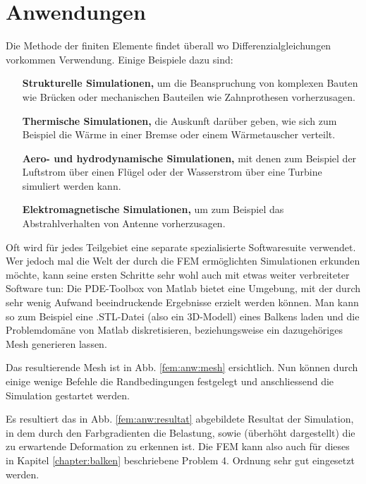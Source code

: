%
%
%
%
\section{Anwendungen\label{fem:section:anwendungen}}

Die Methode der finiten Elemente findet überall wo Differenzialgleichungen vorkommen Verwendung.
Einige Beispiele dazu sind:
\begin{itemize}
    \item [\textbf{Strukturelle Simulationen,}] um die Beanspruchung von komplexen Bauten wie Brücken oder mechanischen Bauteilen wie Zahnprothesen vorherzusagen.
    \item [\textbf{Thermische Simulationen,}] die Auskunft darüber geben, wie sich zum Beispiel die Wärme in einer Bremse oder einem Wärmetauscher verteilt.
    \item [\textbf{Aero- und hydrodynamische Simulationen,}] mit denen zum Beispiel der Luftstrom über einen Flügel oder der Wasserstrom über eine Turbine simuliert werden kann.
    \item [\textbf{Elektromagnetische Simulationen,}] um zum Beispiel das Abstrahlverhalten von Antenne vorherzusagen.
\end{itemize}

Oft wird für jedes Teilgebiet eine separate spezialisierte Softwaresuite verwendet.
Wer jedoch mal die Welt der durch die FEM ermöglichten Simulationen erkunden möchte, kann seine ersten Schritte sehr wohl auch mit etwas weiter verbreiteter Software tun: 
Die PDE-Toolbox von Matlab bietet eine Umgebung, mit der durch sehr wenig Aufwand beeindruckende Ergebnisse erzielt werden können.
Man kann so zum Beispiel eine .STL-Datei (also ein 3D-Modell) eines Balkens laden und die Problemdomäne von Matlab diskretisieren, beziehungsweise ein dazugehöriges Mesh generieren lassen. 

Das resultierende Mesh ist in Abb. \ref{fem:anw:mesh} ersichtlich.
Nun können durch einige wenige Befehle die Randbedingungen festgelegt und anschliessend die Simulation gestartet werden.

Es resultiert das in Abb. \ref{fem:anw:resultat} abgebildete Resultat der Simulation, in dem durch den Farbgradienten die Belastung, sowie (überhöht dargestellt) die zu erwartende Deformation zu erkennen ist.
Die FEM kann also auch für dieses in Kapitel \ref{chapter:balken} beschriebene Problem 4. Ordnung sehr gut eingesetzt werden.